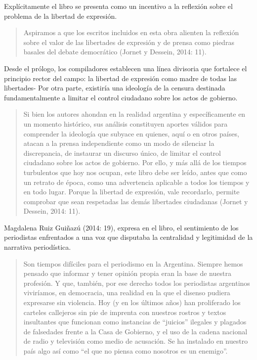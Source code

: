 Explícitamente el libro se presenta como un incentivo a la reflexión sobre el problema de la libertad de expresión.

\begin{quote}
Aspiramos a que los escritos incluidos en esta obra alienten la reflexión sobre el valor de las libertades de expresión y de prensa como piedras basales del debate democrático (Jornet y Dessein, 2014: 11).
\end{quote}

Desde el prólogo, los compiladores establecen una línea divisoria que fortalece el principio rector del campo: la libertad de expresión como madre de todas las libertades- Por otra parte, existiría una ideología de la censura destinada fundamentalmente a limitar el control ciudadano sobre los actos de gobierno.

\begin{quote}
Si bien los autores ahondan en la realidad argentina y específicamente en un momento histórico, sus análisis constituyen aportes válidos para comprender la ideología que subyace en quienes, aquí o en otros países, atacan a la prensa independiente como un modo de silenciar la discrepancia, de instaurar un discurso único, de limitar el control ciudadano sobre los actos de gobierno. Por ello, y más allá de los tiempos turbulentos que hoy nos ocupan, este libro debe ser leído, antes que como un retrato de época, como una advertencia aplicable a todos los tiempos y en todo lugar. Porque la libertad de expresión, vale recordarlo, permite comprobar que sean respetadas las demás libertades ciudadanas (Jornet y Dessein, 2014: 11).
\end{quote}

Magdalena Ruiz Guiñazú (2014: 19), expresa en el libro, el sentimiento de los periodistas enfrentados a una voz que disputaba la centralidad y legitimidad de la narrativa periodística.

\begin{quote}
Son tiempos difíciles para el periodismo en la Argentina. Siempre hemos pensado que informar y tener opinión propia eran la base de nuestra profesión. Y que, también, por ese derecho todos los periodistas argentinos viviríamos, en democracia, una realidad en la que el disenso pudiera expresarse sin violencia. Hoy (y en los últimos años) han proliferado los carteles callejeros sin pie de imprenta con nuestros rostros y textos insultantes que funcionan como instancias de \enquote{juicios} ilegales y plagados de falsedades frente a la Casa de Gobierno, y el uso de la cadena nacional de radio y televisión como medio de acusación. Se ha instalado en nuestro país algo así como \enquote{el que no piensa como nosotros es un enemigo}.
\end{quote}

